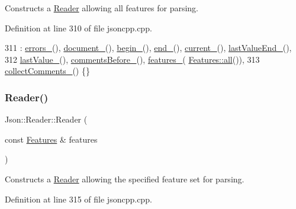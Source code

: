 Constructs a \hyperlink{class_json_1_1_reader}{Reader} allowing all features for parsing. 



Definition at line 310 of file jsoncpp.\+cpp.


\begin{DoxyCode}
311     : \hyperlink{class_json_1_1_reader_a1bbce45dc4df753bed60c129f4b5147c}{errors\_}(), \hyperlink{class_json_1_1_reader_abf99e137bc92a93623dc97598702261a}{document\_}(), \hyperlink{class_json_1_1_reader_a327166839022ea91f0a8290960a8af76}{begin\_}(), \hyperlink{class_json_1_1_reader_a714793579cbf4ee7c5a7223d2c8d77c1}{end\_}(), 
      \hyperlink{class_json_1_1_reader_a2f2feb5201a26da7aa133d2f7434479b}{current\_}(), \hyperlink{class_json_1_1_reader_a497a114f7b760f1b794b8fff9876615a}{lastValueEnd\_}(),
312       \hyperlink{class_json_1_1_reader_a87cc75ae5adc6a6755f0ba1c7255ff6c}{lastValue\_}(), \hyperlink{class_json_1_1_reader_af777967adaf0b2e882efa07673754381}{commentsBefore\_}(), \hyperlink{class_json_1_1_reader_aa9984ff8f519b5541346157b7aebf97b}{features\_}(
      \hyperlink{class_json_1_1_features_a63894da6e2c100b38741fa933f3d33ae}{Features::all}()),
313       \hyperlink{class_json_1_1_reader_a8e9ce743f6004f0596692f0a9ee4626c}{collectComments\_}() \{\}
\end{DoxyCode}
\mbox{\label{class_json_1_1_reader_a45f17831118337309180313e93ac33f8}} 
\subsubsection{\texorpdfstring{Reader()}{Reader()}\hspace{0.1cm}{\footnotesize\ttfamily [2/2]}}
{\footnotesize\ttfamily Json\+::\+Reader\+::\+Reader (\begin{DoxyParamCaption}\item[{const \hyperlink{class_json_1_1_features}{Features} \&}]{features }\end{DoxyParamCaption})}



Constructs a \hyperlink{class_json_1_1_reader}{Reader} allowing the specified feature set for parsing. 



Definition at line 315 of file jsoncpp.\+cpp.


